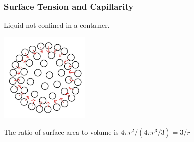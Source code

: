 \documentclass[]{beamer}
\begin{document}
\begin{frame}

\frametitle{Surface Tension and Capillarity}

Liquid not confined in a container.

  \begin{center}
  \includegraphics[height=1.7in]{images2/surfacet8.jpg}
\end{center}


\pause

 The ratio of surface area to volume is $4\pi r^2/(4\pi r^3/3)=3/r$


 \end{frame}

\end{document}
